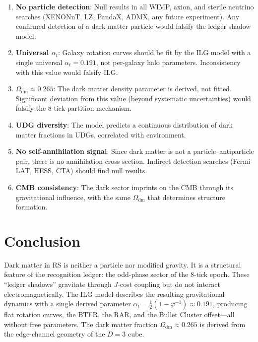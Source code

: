 \documentclass[12pt,a4paper]{article}
\theoremstyle{definition}
\theoremstyle{remark}
\begin{document}
\begin{enumerate}
  \item \textbf{No particle detection}: Null results in all
  WIMP, axion, and sterile neutrino searches (XENONnT, LZ,
  PandaX, ADMX, any future experiment).  Any confirmed
  detection of a dark matter particle would falsify the
  ledger shadow model.

  \item \textbf{Universal $\alpha_t$}: Galaxy rotation curves
  should be fit by the ILG model with a single universal
  $\alpha_t = 0.191$, not per-galaxy halo parameters.
  Inconsistency with this value would falsify ILG.

  \item \textbf{$\Omega_{\mathrm{dm}} \approx 0.265$}:
  The dark matter density parameter is derived, not fitted.
  Significant deviation from this value (beyond systematic
  uncertainties) would falsify the 8-tick partition
  mechanism.

  \item \textbf{UDG diversity}: The model predicts a
  continuous distribution of dark matter fractions in UDGs,
  correlated with environment.

  \item \textbf{No self-annihilation signal}: Since dark
  matter is not a particle--antiparticle pair, there is no
  annihilation cross section.  Indirect detection searches
  (Fermi-LAT, HESS, CTA) should find null results.

  \item \textbf{CMB consistency}: The dark sector imprints
  on the CMB through its gravitational influence, with the
  same $\Omega_{\mathrm{dm}}$ that determines structure
  formation.
\end{enumerate}

\section{Conclusion}
\label{sec:conclusion}

Dark matter in RS is neither a particle nor modified gravity.
It is a structural feature of the recognition ledger: the
odd-phase sector of the 8-tick epoch.  These ``ledger
shadows'' gravitate through $J$-cost coupling but do not
interact electromagnetically.  The ILG model describes the
resulting gravitational dynamics with a single derived
parameter $\alpha_t = \tfrac{1}{2}(1 - \varphi^{-1})
\approx 0.191$, producing flat rotation curves, the BTFR,
the RAR, and the Bullet Cluster offset---all without free
parameters.  The dark matter fraction
$\Omega_{\mathrm{dm}} \approx 0.265$ is derived from the
edge-channel geometry of the $D = 3$ cube.
\end{document}
